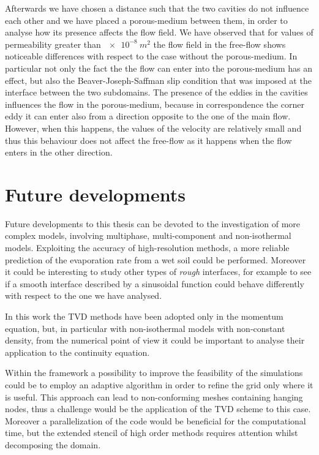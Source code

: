 Afterwards we have chosen a distance such that the two cavities do not 
influence each other and we have placed a porous-medium between them, in order 
to analyse how its presence affects the flow field. We have observed that 
for values of permeability greater than $\SI{e-8}{m^2}$ the flow field in the 
free-flow shows noticeable differences with respect to the case without the 
porous-medium. In particular not only the fact the the flow can enter into the 
porous-medium has an effect, but also the Beaver-Joseph-Saffman slip condition 
that was imposed at the interface between the two subdomains. The presence of 
the eddies in the cavities influences the flow in the porous-medium, because 
in correspondence the corner eddy it can enter also from a direction opposite 
to the one of the main flow. However, when this happens, the values of the 
velocity are relatively small and thus this behaviour does not affect the free-flow as it happens when the flow enters in the other direction.
%
\section{Future developments}
Future developments to this thesis can be devoted to the investigation of more 
complex models, involving multiphase, multi-component and non-isothermal 
models. Exploiting the accuracy of high-resolution methods, a more reliable 
prediction of the evaporation rate from a wet soil could be performed. Moreover it could be interesting to study other types of \emph{rough} interfaces, for example to see if a smooth interface described by a sinusoidal function could behave differently with respect to the one we have analysed.

In this work the TVD methods have been adopted only in the momentum equation, 
but, in particular with non-isothermal models with non-constant density, from 
the numerical point of view it could be important to analyse their 
application to the continuity equation.

Within the \DUMUX framework a possibility to improve the feasibility of the 
simulations could be to employ an adaptive algorithm in order to refine the grid 
only where it is useful. This approach can lead to non-conforming meshes 
containing hanging nodes, thus a challenge would be the application of the TVD 
scheme to this case. Moreover a parallelization of the code would be 
beneficial for the computational time, but the extended stencil of high order methods 
requires attention whilst decomposing the domain.